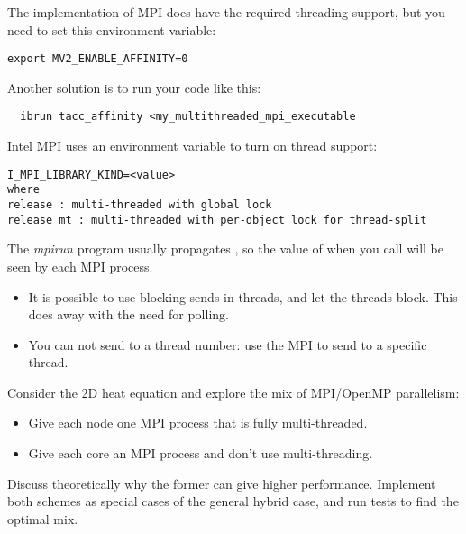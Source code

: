 \begin{tacc}
  The  implementation of MPI
  does have the required threading support, but you need to set this environment variable:  
\begin{verbatim}
export MV2_ENABLE_AFFINITY=0
\end{verbatim}
  Another solution is to run your code like this:
\begin{verbatim}
  ibrun tacc_affinity <my_multithreaded_mpi_executable
\end{verbatim}
  Intel MPI uses an environment variable to turn on thread support:
\begin{verbatim}
I_MPI_LIBRARY_KIND=<value>
where
release : multi-threaded with global lock
release_mt : multi-threaded with per-object lock for thread-split  
\end{verbatim}
\end{tacc}

The \emph{mpirun}
program usually propagates ,
so the value of  when you call 
will be seen by each MPI process.

\begin{itemize}
\item It is possible to use blocking sends in threads, and let the
  threads block. This does away with the need for polling.
\item You can not send to a thread number: use the MPI
   to send to a specific thread.
\end{itemize}

\begin{exercise}
Consider the 2D heat equation and explore the mix of MPI/OpenMP
parallelism:
\begin{itemize}
\item Give each node one MPI process that is fully multi-threaded.
\item Give each core an MPI process and don't use multi-threading.
\end{itemize}
Discuss theoretically why the former can give higher performance.
Implement both schemes as special cases of the general hybrid case,
and run tests to find the optimal mix.
\end{exercise}

